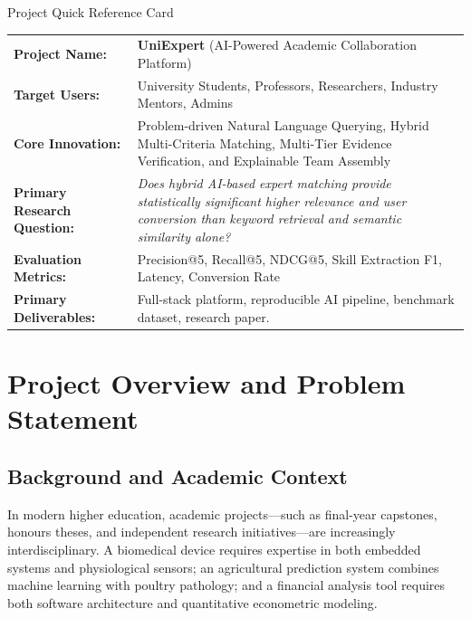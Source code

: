 \documentclass[11pt,a4paper]{article}
\begin{document}
\vspace{0.8cm}
\begin{calloutbox}{Project Quick Reference Card}
\begin{tabularx}{\textwidth}{@{}lX@{}}
\textbf{Project Name:} & \textbf{UniExpert} (AI-Powered Academic Collaboration Platform) \\
\textbf{Target Users:} & University Students, Professors, Researchers, Industry Mentors, Admins \\
\textbf{Core Innovation:} & Problem-driven Natural Language Querying, Hybrid Multi-Criteria Matching, Multi-Tier Evidence Verification, and Explainable Team Assembly \\
\textbf{Primary Research Question:} & \textit{Does hybrid AI-based expert matching provide statistically significant higher relevance and user conversion than keyword retrieval and semantic similarity alone?} \\
\textbf{Evaluation Metrics:} & Precision@5, Recall@5, NDCG@5, Skill Extraction F1, Latency, Conversion Rate \\
\textbf{Primary Deliverables:} & Full-stack platform, reproducible AI pipeline, benchmark dataset, research paper.
\end{tabularx}
\end{calloutbox}

\newpage
\tableofcontents
\vspace{0.5cm}
\listoffigures
\vspace{0.5cm}
\listoftables
\newpage

\section{Project Overview and Problem Statement}

\subsection{Background and Academic Context}
In modern higher education, academic projects---such as final-year capstones, honours theses, and independent research initiatives---are increasingly interdisciplinary. A biomedical device requires expertise in both embedded systems and physiological sensors; an agricultural prediction system combines machine learning with poultry pathology; and a financial analysis tool requires both software architecture and quantitative econometric modeling. 
\end{document}
